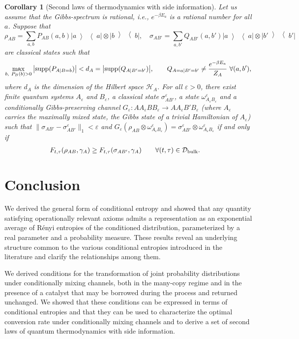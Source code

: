 \documentclass[aps,pra,11pt,onecolumn,nofootinbib,tightenlines]{revtex4-2}
\newtheorem{corollary}[theorem]{Corollary}
\theoremstyle{definition}
\newcommand{\mc}[1]{\mathcal{#1}}
\newcommand{\ketbra}[2]{\left|#1\middle\rangle\middle\langle #2\right|}
\begin{document}
\begin{corollary}[Second laws of thermodynamics with side information]\label{cor:secondlaws}
Let us assume that the Gibbs-spectrum is rational, i.e., $e^{-\beta E_a}$ is a rational number for all $a$. Suppose that
\begin{equation}
\rho_{AB}=\sum_{a,b}P_{AB}(a,b)\ketbra{a}{a}\otimes\ketbra{b}{b},\quad\sigma_{AB'}=\sum_{a,b'}Q_{AB'}(a,b')\ketbra{a}{a}\otimes\ketbra{b'}{b'}
\end{equation}
are classical states such that
\begin{equation}
\max_{b,\ P_B(b)>0}\big|{\rm supp}(P_{A|B=b})\big| <d_A=\big|{\rm supp}(Q_{A|B'=b'})\big|,\qquad Q_{A=a|B'=b'}\neq\frac{e^{-\beta E_a}}{Z_A}\ \forall(a,b'),
\end{equation}
where $d_A$ is the dimension of the Hilbert space $\mc H_A$. For all $\varepsilon>0$, there exist finite quantum systems $A_\varepsilon$ and $B_\varepsilon$, a classical state $\sigma^\varepsilon_{AB'}$, a state $\omega^\varepsilon_{A_\varepsilon B_\varepsilon}$ and a conditionally Gibbs-preserving channel $G_\varepsilon:AA_\varepsilon BB_\varepsilon\to AA_\varepsilon B'B_\varepsilon$ (where $A_\varepsilon$ carries the maximally mixed state, the Gibbs state of a trivial Hamiltonian of $A_\varepsilon$) such that $\|\sigma_{AB'}-\sigma^\varepsilon_{AB'}\|_1<\varepsilon$ and $G_\varepsilon(\rho_{AB}\otimes\omega^\varepsilon_{A_\varepsilon B_\varepsilon})=\sigma^\varepsilon_{AB'}\otimes\omega^\varepsilon_{A_\varepsilon B_\varepsilon}$ if and only if
\begin{align}
F_{t,\tau}(\rho_{AB},\gamma_A)&\geq F_{t,\tau}(\sigma_{AB'},\gamma_A)\qquad\forall(t,\tau)\in\mc D_{\rm bulk}.
\end{align}
\end{corollary}

\section{Conclusion}
We derived the general form of conditional entropy and showed that any quantity satisfying operationally relevant axioms admits a representation as an exponential average of R\'enyi entropies of the conditioned distribution, parameterized by a real parameter and a probability measure.
These results reveal an underlying structure common to the various conditional entropies introduced in the literature and clarify the relationships among them.




We derived conditions for the transformation of joint probability distributions under conditionally mixing channels, both in the many-copy regime and in the presence of a catalyst that may be borrowed during the process and returned unchanged. We showed that these conditions can be expressed in terms of conditional entropies
and that they can be used to characterize the optimal conversion rate under conditionally mixing channels and to derive a set of second laws of quantum thermodynamics with side information.
\end{document}
